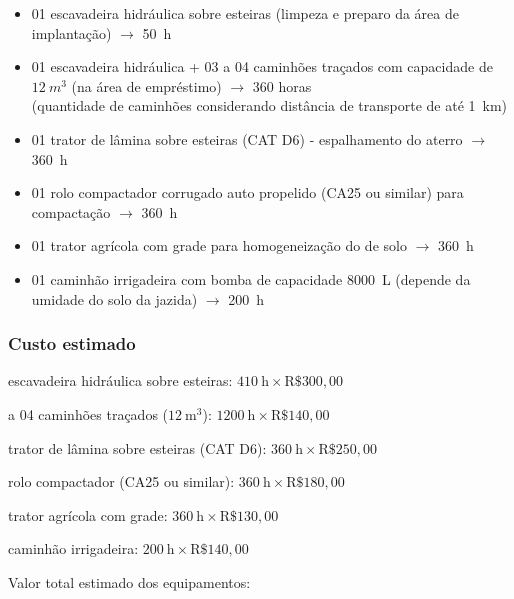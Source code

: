 \documentclass[a4paper, 12pt, brazilian]{article}
\begin{document}
	\begin{itemize}
		\item 01 escavadeira hidráulica sobre esteiras (limpeza e preparo da área de implantação) $\rightarrow$ \SI{50}{\hour}
		
		\item 01 escavadeira hidráulica + 03 a 04 caminhões traçados com capacidade de $\SI{12}{m^{3}}$ (na área de empréstimo) $\rightarrow$ 360 horas \\(quantidade de caminhões considerando distância de transporte de até \SI{1}{\kilo\meter})
		
		\item 01 trator de lâmina sobre esteiras (CAT D6) - espalhamento do aterro $\rightarrow$ \SI{360}{\hour}
		
		\item 01 rolo compactador corrugado auto propelido (CA25 ou similar) para compactação $\rightarrow$ \SI{360}{\hour}
		
		\item 01 trator agrícola com grade para homogeneização do de solo $\rightarrow$ \SI{360}{\hour}
		
		\item 01 caminhão irrigadeira com bomba de capacidade \SI{8000}{\liter} (depende da umidade do solo da jazida) $\rightarrow$ \SI{200}{\hour} 
	\end{itemize}
	
	\subsubsection{Custo estimado}
	
	 escavadeira hidráulica sobre esteiras: $\SI{410}{\hour}\times\textrm{R\$}300,00$
	
	 a 04 caminhões traçados ($\SI{12}{\meter^{3}}$): $\SI{1200}{\hour}\times\textrm{R\$}140,00$
	
	 trator de lâmina sobre esteiras (CAT D6): $\SI{360}{\hour}\times\textrm{R\$}250,00$
	
	 rolo compactador (CA25 ou similar):  $\SI{360}{\hour}\times\textrm{R\$}180,00$
	
	 trator agrícola com grade: $\SI{360}{\hour}\times\textrm{R\$}130,00$
	
	 caminhão irrigadeira:  $\SI{200}{\hour}\times\textrm{R\$}140,00$
	
	\noindent Valor total estimado dos equipamentos: 
	
	
	
\end{document}
